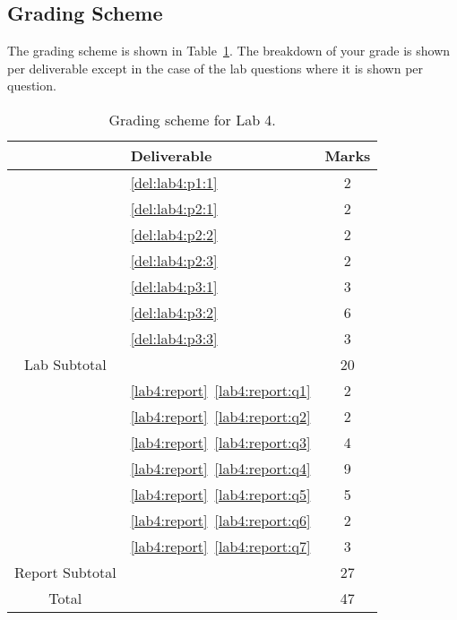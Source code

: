 \subsection{Grading Scheme}
The grading scheme is shown in Table~\ref{tab:lab4:grading}. The breakdown of
your grade is shown per deliverable except in the case of the lab
questions where it is shown per question.
%
\begin{table}[H]
\centering
\caption[Grading Scheme for Lab 4]{Grading scheme for Lab 4.}
\label{tab:lab4:grading}
\begin{tabular}{c|l|c}
        & Deliverable           & Marks  \\ \hline
        & \ref{del:lab4:p1:1}         & 2       \\ \hline
        & \ref{del:lab4:p2:1}         & 2       \\ \hline
        & \ref{del:lab4:p2:2}         & 2      \\ \hline
        & \ref{del:lab4:p2:3}         & 2      \\ \hline
        & \ref{del:lab4:p3:1}         & 3       \\ \hline
        & \ref{del:lab4:p3:2}         & 6       \\ \hline
        & \ref{del:lab4:p3:3}         & 3       \\ \hhline{=|=|=}
Lab Subtotal&                       & 20      \\ \hhline{=|=|=}
        & \ref{lab4:report}~\ref{lab4:report:q1}  & 2       \\ \hline
        & \ref{lab4:report}~\ref{lab4:report:q2}  & 2       \\ \hline
        & \ref{lab4:report}~\ref{lab4:report:q3}  & 4      \\ \hline
        & \ref{lab4:report}~\ref{lab4:report:q4}  & 9       \\ \hline
        & \ref{lab4:report}~\ref{lab4:report:q5}  & 5      \\ \hline
        & \ref{lab4:report}~\ref{lab4:report:q6}  & 2      \\ \hline
        & \ref{lab4:report}~\ref{lab4:report:q7}  & 3      \\ \hhline{=|=|=}
Report Subtotal&  & 27 \\ \hhline{=|=|=}
  Total &                       & 47
\end{tabular}
\end{table}
%
